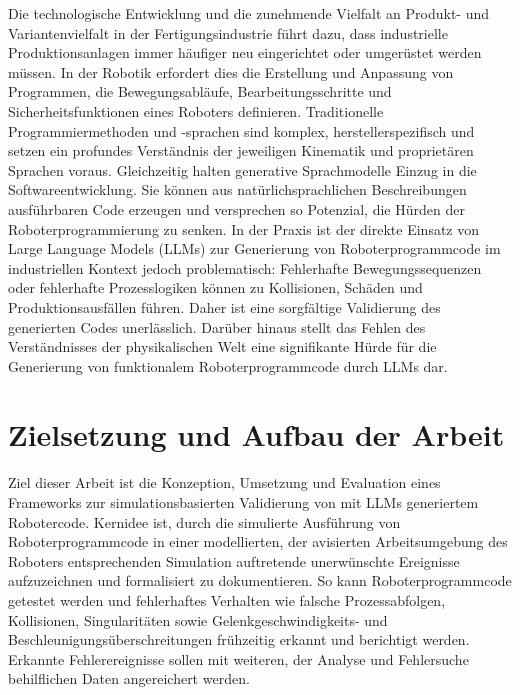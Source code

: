 Die technologische Entwicklung und die zunehmende Vielfalt
an Produkt- und Variantenvielfalt in der Fertigungsindustrie führt dazu, dass
industrielle Produktionsanlagen immer häufiger neu eingerichtet oder
umgerüstet werden müssen. In der Robotik erfordert dies die
Erstellung und Anpassung von Programmen, die Bewegungsabläufe,
Bearbeitungsschritte und Sicherheitsfunktionen eines Roboters
definieren.
Traditionelle Programmiermethoden und -sprachen sind komplex,
herstellerspezifisch und setzen ein profundes Verständnis der
jeweiligen Kinematik und proprietären Sprachen
voraus. Gleichzeitig halten generative
Sprachmodelle Einzug in die
Softwareentwicklung. Sie können aus natürlichsprachlichen
Beschreibungen ausführbaren Code erzeugen und versprechen so Potenzial, die
Hürden der Roboterprogrammierung zu
senken. In der Praxis ist der
direkte Einsatz von Large Language Models (LLMs) zur Generierung von
Roboterprogrammcode im industriellen Kontext jedoch problematisch:
Fehlerhafte Bewegungssequenzen
oder fehlerhafte Prozesslogiken können zu Kollisionen, Schäden und
Produktionsausfällen führen. Daher ist eine
sorgfältige Validierung des
generierten Codes unerlässlich. Darüber hinaus stellt das Fehlen des
Verständnisses der physikalischen Welt eine signifikante Hürde für  die
Generierung von funktionalem Roboterprogrammcode durch LLMs
dar.

\section{Zielsetzung und Aufbau der Arbeit}
\label{sec:Zielsetzung}
Ziel dieser Arbeit ist die Konzeption, Umsetzung und Evaluation eines
Frameworks zur simulationsbasierten Validierung von mit LLMs
generiertem Robotercode. Kernidee ist, durch die simulierte Ausführung von
Roboterprogrammcode in einer modellierten, der avisierten
Arbeitsumgebung des Roboters
entsprechenden Simulation auftretende unerwünschte Ereignisse
aufzuzeichnen und formalisiert zu dokumentieren. So kann Roboterprogrammcode
getestet werden und fehlerhaftes Verhalten wie falsche Prozessabfolgen,
Kollisionen, Singularitäten sowie Gelenkgeschwindigkeits- und
Beschleunigungsüberschreitungen frühzeitig erkannt und berichtigt werden.
Erkannte Fehlerereignisse sollen mit weiteren, der Analyse und Fehlersuche
behilflichen Daten angereichert werden.

